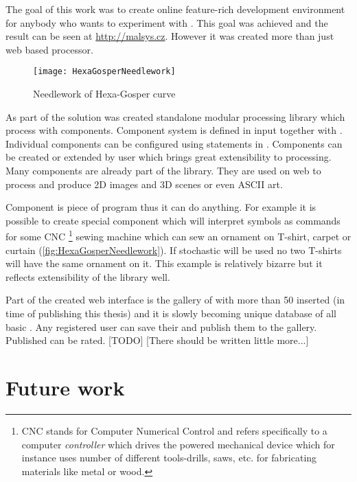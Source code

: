 

The goal of this work was to create online feature-rich development environment for anybody who wants to experiment with \lsystems.
This goal was achieved and the result can be seen at \url{http://malsys.cz}.
However it was created more than just web based \lsystem processor.

\begin{wrapfigure}{r}{0.5\textwidth}
	\texttt{[image: HexaGosperNeedlework]}
	\caption{Needlework of Hexa-Gosper curve}
	\label{fig:HexaGosperNeedlework}
\end{wrapfigure}

As part of the solution was created standalone modular \lsystem processing library which process \lsystems with components.
Component system is defined in input together with \lsystems.
Individual components can be configured using statements in \lsystems.
Components can be created or extended by user which brings great extensibility to \lsystem processing.
Many components are already part of the library.
They are used on web to process \lsystems and produce 2D images and 3D scenes or even ASCII art.

Component is piece of program thus it can do anything.
For example it is possible to create special component which will interpret \lsystem symbols as commands for some CNC%
	\footnote{CNC stands for Computer Numerical Control and refers specifically to a computer \emph{controller} which drives the powered mechanical device
		which for instance uses number of different tools-drills, saws, etc. for fabricating materials like metal or wood.} 
	sewing machine which can sew an ornament on T-shirt, carpet or curtain (\autoref{fig:HexaGosperNeedlework}).
If stochastic \lsystem will be used no two T-shirts will have the same ornament on it.
This example is relatively bizarre but it reflects extensibility of the library well.

Part of the created web interface is the gallery of \lsystems with more than 50 inserted \lsystems (in time of publishing this thesis) and it is slowly becoming unique database of all basic \lsystems.
Any registered user can save their \lsystems and publish them to the gallery.
Published \lsystems can be rated.
[TODO]
[There should be written little more...]


\section*{Future work}

